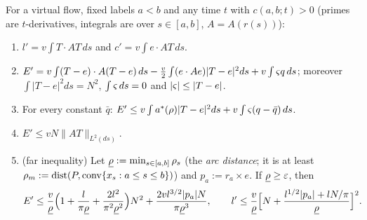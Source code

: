 \begin{lemma}\label{lem:excess}
For a virtual flow, fixed labels $a<b$ and any time $t$ with $c(a,b;t)>0$ \textup(primes are $t$-derivatives, integrals are over
$s\in[a,b]$, $A=A(r(s))$\textup):
\begin{enumerate}
\item[(i)] $l'=v\int T\cdot AT\,ds$ and $c'=v\int e\cdot AT\,ds$.
\item[(ii)] $E'=v\int(T-e)\cdot A(T-e)\,ds-\frac v2\int(e\cdot Ae)|T-e|^2ds+v\int\varsigma q\,ds$; moreover $\int|T-e|^2ds=N^2$,
$\int\varsigma\,ds=0$ and $|\varsigma|\le|T-e|$.
\item[(iii)] For every constant $\bar q$: $E'\le v\int a^*(\rho)|T-e|^2ds+v\int\varsigma(q-\bar q)\,ds$.
\item[(iv)] $E'\le vN\|AT\|_{L^2(ds)}$.
\item[(v)] \textup{(far inequality)} Let $\underline\rho:=\min_{s\in[a,b]}\rho_s$ \textup(the \emph{arc distance}; it is at least
$\rho_m:=\operatorname{dist}(P,\operatorname{conv}\{x_s:a\le s\le b\})$\textup) and $p_a:=r_a\times e$. If $\underline\rho\ge\varepsilon$, then
\[
E'\le\frac v{\underline\rho}\Bigl(1+\frac l{\pi\underline\rho}+\frac{2l^2}{\pi^2\underline\rho^2}\Bigr)N^2+\frac{2vl^{3/2}|p_a|N}{\pi\underline\rho^3},\qquad
l'\le\frac v{\underline\rho}\Bigl[N+\frac{l^{1/2}|p_a|+lN/\pi}{\underline\rho}\Bigr]^2.
\]
\end{enumerate}
\end{lemma}

